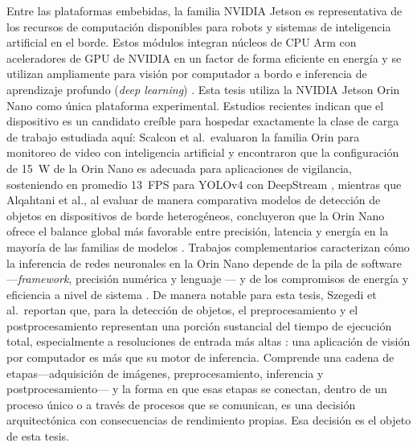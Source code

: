 Entre las plataformas embebidas, la familia NVIDIA Jetson es representativa
de los recursos de computación disponibles para robots y sistemas de
inteligencia artificial en el borde. Estos módulos integran núcleos de CPU
Arm con aceleradores de GPU de NVIDIA en un factor de forma eficiente en
energía y se utilizan ampliamente para visión por computador a bordo e
inferencia de aprendizaje profundo (\emph{deep learning}) \cite{scalcon2024}.
Esta tesis utiliza la NVIDIA Jetson Orin Nano como única plataforma
experimental. Estudios recientes indican que el dispositivo es un candidato
creíble para hospedar exactamente la clase de carga de trabajo estudiada
aquí: Scalcon et al.\ evaluaron la familia Orin para monitoreo de video con
inteligencia artificial y encontraron que la configuración de 15~W de la
Orin Nano es adecuada para aplicaciones de vigilancia, sosteniendo en
promedio 13~FPS para YOLOv4 con DeepStream \cite{scalcon2024}, mientras que
Alqahtani et al., al evaluar de manera comparativa modelos de detección de
objetos en dispositivos de borde heterogéneos, concluyeron que la Orin Nano
ofrece el balance global más favorable entre precisión, latencia y energía
en la mayoría de las familias de modelos \cite{alqahtani2026}. Trabajos
complementarios caracterizan cómo la inferencia de redes neuronales en la
Orin Nano depende de la pila de software---\emph{framework}, precisión
numérica y lenguaje \cite{szegedi2026}--- y de los compromisos de energía y
eficiencia a nivel de sistema \cite{zequn2026}. De manera notable para esta
tesis, Szegedi et al.\ reportan que, para la detección de objetos, el
preprocesamiento y el postprocesamiento representan una porción sustancial
del tiempo de ejecución total, especialmente a resoluciones de entrada más
altas \cite{szegedi2026}: una aplicación de visión por computador es más que
su motor de inferencia. Comprende una cadena de etapas---adquisición de
imágenes, preprocesamiento, inferencia y postprocesamiento--- y la forma en
que esas etapas se conectan, dentro de un proceso único o a través de
procesos que se comunican, es una decisión arquitectónica con consecuencias
de rendimiento propias. Esa decisión es el objeto de esta tesis.

